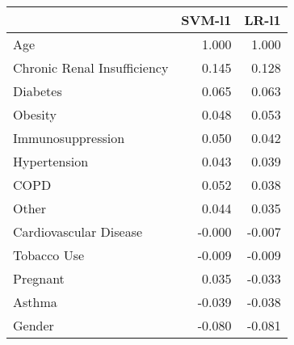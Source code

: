 \begin{tabular}{lrr}
\toprule
{} &  SVM-l1 &  LR-l1 \\
\midrule
Age                         &   1.000 &  1.000 \\
Chronic Renal Insufficiency &   0.145 &  0.128 \\
Diabetes                    &   0.065 &  0.063 \\
Obesity                     &   0.048 &  0.053 \\
Immunosuppression           &   0.050 &  0.042 \\
Hypertension                &   0.043 &  0.039 \\
COPD                        &   0.052 &  0.038 \\
Other                       &   0.044 &  0.035 \\
Cardiovascular Disease      &  -0.000 & -0.007 \\
Tobacco Use                 &  -0.009 & -0.009 \\
Pregnant                    &   0.035 & -0.033 \\
Asthma                      &  -0.039 & -0.038 \\
Gender                      &  -0.080 & -0.081 \\
\bottomrule
\end{tabular}
